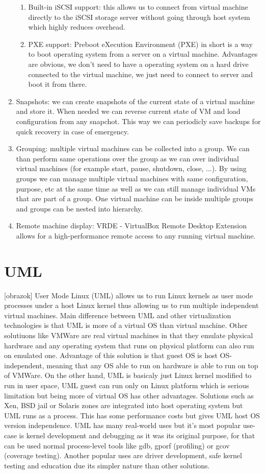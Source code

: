 \begin{enumerate}
\begin{enumerate}
\item Built-in iSCSI support: this allows us to connect from virtual machine directly to the iSCSI storage server without going through host system which
highly reduces overhead.
\item PXE support: Preboot eXecution Environment (PXE) in short is a way to boot operating system from a server on a virtual machine. Advantages are obvious, we don't need to have a operating system on a hard drive connected to the virtual machine, we just need to connect to server and boot it from there.
\end{enumerate}
\item Snapshots: we can create snapshots of the current state of a virtual machine and store it. When needed we can reverse current state of VM and load configuration from any snapchot. This way we can periodicly save backups for quick recovery in case of emergency.
\item Grouping: multiple virtual machines can be collected into a group. We can than perform same operations over the group as we can over individual virtual machines (for example start, pause, shutdown, close, ...). By using groups we can manage multiple virtual machines with same configuration, purpose, etc at the same time as well as we can still manage individual VMs that are part of a group. One virtual machine can be inside multiple groups and groups can be nested into hierarchy.
\item Remote machine display: VRDE - VirtualBox Remote Desktop Extension allows for a high-performance remote access to any running virtual machine.
\end{enumerate}


\section{UML}
[obrazok] User Mode Linux (UML) allows us to run Linux kernels as user mode processes under a host Linux kernel thus allowing us to run multiple independent virtual machines. Main difference between UML and other virtualization technologies is that UML is more of a virtual OS than virtual machine. Other solutiuons like VMWare are real virtual machines in that they emulate physical hardware and any operating system that runs on physical platform can also run on emulated one. Advantage of this solution is that guest OS is host OS-independent, meaning that any OS able to run on hardware is able to run on top of VMWare. On the other hand, UML is basicaly just Linux kernel modified to run in user space, UML guest can run only on Linux platform which is serious limitation but being more of virtual OS has other advantages. Solutions such as Xen, BSD jail or Solaris zones are integrated into host operating system but UML runs as a process. This has some performance costs but gives UML host OS version independence. UML has many real-world uses but it's most popular use-case is kernel development and debugging as it was its original purpose, for that can be used normal process-level tools like gdb, gporf (profiling) or gcov (coverage testing). Another popular uses are driver development, safe kernel testing and education due its simpler nature than other solutions.


